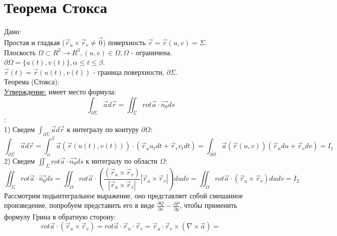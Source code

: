 \documentclass[12pt]{article}
\begin{document}
\section{Теорема Стокса}
Дано:\\
Простая и гладкая ($\overrightarrow{r}_u \times \overrightarrow{r}_v \neq \overrightarrow{0}$) поверхность $\overrightarrow{r} = \overrightarrow{r} (u,v) = \Sigma$.\\
Плоскость $\Omega \subset R^2 \to R^3, (u,v) \in \Omega, \Omega$ - ограничена.\\
$\partial \Omega = \{ u(t), v(t) \}, \alpha \leq t \leq \beta$.\\
$\overrightarrow{r}(t) = \overrightarrow{r}(u(t),v(t))$ - граница поверхности, $\partial \Sigma$.\\
Теорема (Стокса):\\
\uline{Утверждение:} имеет место формула:\\
$$\int_{\partial \Sigma} \overrightarrow{a} d \overrightarrow{r} = \iint_{\Sigma} rot \overrightarrow{a} \cdot \overrightarrow{n_0} ds$$
:\\
1) Сведем $\int_{\partial \Sigma} \overrightarrow{a} d \overrightarrow{r}$ к интегралу по контуру $\partial \Omega$:\\
$$\int_{\partial \Sigma} \overrightarrow{a} d \overrightarrow{r} = \int_{\alpha}^{\beta} \overrightarrow{a} (\overrightarrow{r}(u(t),v(t))) \cdot (\overrightarrow{r}_u u_t dt + \overrightarrow{r}_v v_t dt) = \int_{\partial \Omega} \overrightarrow{a} (\overrightarrow{r}(u,v)) (\overrightarrow{r}_u du + \overrightarrow{r}_v dv) = I_1$$
2) Сведем $\iint_{\Sigma} rot \overrightarrow{a} \cdot \overrightarrow{n_0} ds$ к интегралу по области $\Omega$:\\
$$\iint_{\Sigma} rot \overrightarrow{a} \cdot \overrightarrow{n_0} ds = \iint_{\Omega} rot \overrightarrow{a} \cdot (\frac{(\overrightarrow{r}_u \times \overrightarrow{r}_v)}{|\overrightarrow{r}_u \times \overrightarrow{r}_v|} |\overrightarrow{r}_u \times \overrightarrow{r}_v|) du dv = \iint_{\Omega} rot \overrightarrow{a} \cdot (\overrightarrow{r}_u \times \overrightarrow{r}_v) du dv = I_2$$
Рассмотрим подынтегральное выражение, оно представляет собой смешанное произведение, попробуем представить его в виде $\frac{\partial Q}{\partial x} - \frac{\partial P}{\partial y}$, чтобы применить формулу Грина в обратную сторону:\\
$$rot \overrightarrow{a} \cdot (\overrightarrow{r}_u \times \overrightarrow{r}_v) = rot \overrightarrow{a} \cdot \overrightarrow{r}_u \cdot \overrightarrow{r}_v = \overrightarrow{r}_u \cdot \overrightarrow{r}_v \times (\nabla \times \overrightarrow{a}) =$$
\end{document}

